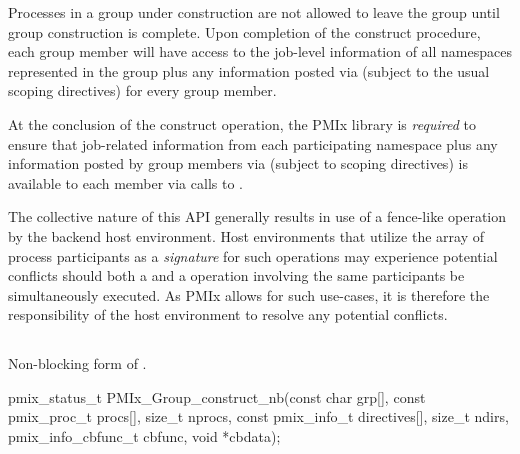 Processes in a group under construction are not allowed to leave the group until group construction is complete. Upon completion of the construct procedure, each group member will have access to the job-level information of all namespaces represented in the group plus any information posted via  (subject to the usual scoping directives) for every group member.

\adviceimplstart
At the conclusion of the construct operation, the \ac{PMIx} library is \emph{required} to ensure that job-related information from each participating namespace plus any information posted by group members via  (subject to scoping directives) is available to each member via calls to .
\adviceimplend

\advicermstart
The collective nature of this \ac{API} generally results in use of a fence-like operation by the backend host environment. Host environments that utilize the array of process participants as a \emph{signature} for such operations may experience potential conflicts should both a  and a  operation involving the same participants be simultaneously executed. As \ac{PMIx} allows for such use-cases, it is therefore the responsibility of the host environment to resolve any potential conflicts.
\advicermend

\subsection{}

\summary

Non-blocking form of .

\format

\cspecificstart
\begin{codepar}
pmix_status_t
PMIx_Group_construct_nb(const char grp[],
                        const pmix_proc_t procs[], size_t nprocs,
                        const pmix_info_t directives[],
                        size_t ndirs,
                        pmix_info_cbfunc_t cbfunc, void *cbdata);
\end{codepar}
\cspecificend

\begin{arglist}
\end{arglist}

